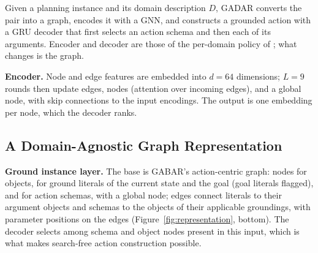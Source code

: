 \documentclass[letterpaper]{article} %
\newcommand{\gadar}{GADAR}                    %
\begin{document}
Given a planning instance and its domain description $D$, \gadar{} converts
the pair into a graph, encodes it with a GNN, and constructs a grounded
action with a GRU decoder that first selects an action schema and then each
of its arguments. Encoder and decoder are those of the per-domain policy of
\citet{gabar}; what changes is the graph.

\textbf{Encoder.} Node and edge features are embedded into $d{=}64$
dimensions; $L{=}9$ rounds then update edges, nodes (attention over incoming
edges), and a global node, with skip connections to the input encodings. The
output is one embedding per node, which the decoder ranks.

\subsection{A Domain-Agnostic Graph Representation}

\textbf{Ground instance layer.} The base is GABAR's action-centric graph:
nodes for objects, for ground literals of the current state and the goal
(goal literals flagged), and for action schemas, with a global node; edges
connect literals to their argument objects and schemas to the objects of
their applicable groundings, with parameter positions on the edges
(Figure~\ref{fig:representation}, bottom). The decoder selects among schema
and object nodes present in this input, which is what makes search-free
action construction possible.
\end{document}
